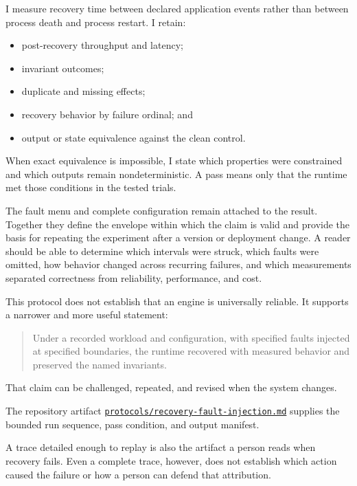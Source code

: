 
I measure recovery time between declared application events rather than between process death and process restart. I retain:

\begin{itemize}
\tightlist
\item
  post-recovery throughput and latency;
\item
  invariant outcomes;
\item
  duplicate and missing effects;
\item
  recovery behavior by failure ordinal; and
\item
  output or state equivalence against the clean control.
\end{itemize}

When exact equivalence is impossible, I state which properties were constrained and which outputs remain nondeterministic. A pass means only that the runtime met those conditions in the tested trials.

The fault menu and complete configuration remain attached to the result. Together they define the envelope within which the claim is valid and provide the basis for repeating the experiment after a version or deployment change. A reader should be able to determine which intervals were struck, which faults were omitted, how behavior changed across recurring failures, and which measurements separated correctness from reliability, performance, and cost.

This protocol does not establish that an engine is universally reliable. It supports a narrower and more useful statement:

\begin{quote}
Under a recorded workload and configuration, with specified faults injected at specified boundaries, the runtime recovered with measured behavior and preserved the named invariants.
\end{quote}

That claim can be challenged, repeated, and revised when the system changes.

The repository artifact \href{https://github.com/sjarmak/engineering-reliable-coding-agents/blob/main/protocols/recovery-fault-injection.md}{\texttt{protocols/recovery-fault-injection.md}} supplies the bounded run sequence, pass condition, and output manifest.

A trace detailed enough to replay is also the artifact a person reads when recovery fails. Even a complete trace, however, does not establish which action caused the failure or how a person can defend that attribution.

